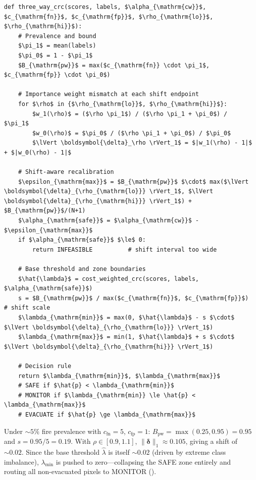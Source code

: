 \documentclass{article}
\begin{document}
\begin{center}
    \begin{minipage}{0.92\textwidth}
        \begin{lstlisting}[style=pseudocode, title={\textbf{Algorithm 1}\; Three-Way CRC for Wildfire Evacuation}]
def three_way_crc(scores, labels, $\alpha_{\mathrm{cw}}$, $c_{\mathrm{fn}}$, $c_{\mathrm{fp}}$, $\rho_{\mathrm{lo}}$, $\rho_{\mathrm{hi}}$):
    # Prevalence and bound
    $\pi_1$ = mean(labels)
    $\pi_0$ = 1 - $\pi_1$
    $B_{\mathrm{pw}}$ = max($c_{\mathrm{fn}} \cdot \pi_1$, $c_{\mathrm{fp}} \cdot \pi_0$)

    # Importance weight mismatch at each shift endpoint
    for $\rho$ in {$\rho_{\mathrm{lo}}$, $\rho_{\mathrm{hi}}$}:
        $w_1(\rho)$ = ($\rho \pi_1$) / ($\rho \pi_1 + \pi_0$) / $\pi_1$
        $w_0(\rho)$ = $\pi_0$ / ($\rho \pi_1 + \pi_0$) / $\pi_0$
        $\lVert \boldsymbol{\delta}_\rho \rVert_1$ = $|w_1(\rho) - 1|$ + $|w_0(\rho) - 1|$

    # Shift-aware recalibration
    $\epsilon_{\mathrm{max}}$ = $B_{\mathrm{pw}}$ $\cdot$ max($\lVert \boldsymbol{\delta}_{\rho_{\mathrm{lo}}} \rVert_1$, $\lVert \boldsymbol{\delta}_{\rho_{\mathrm{hi}}} \rVert_1$) + $B_{\mathrm{pw}}$/(N+1)
    $\alpha_{\mathrm{safe}}$ = $\alpha_{\mathrm{cw}}$ - $\epsilon_{\mathrm{max}}$
    if $\alpha_{\mathrm{safe}}$ $\le$ 0:
        return INFEASIBLE          # shift interval too wide

    # Base threshold and zone boundaries
    $\hat{\lambda}$ = cost_weighted_crc(scores, labels, $\alpha_{\mathrm{safe}}$)
    s = $B_{\mathrm{pw}}$ / max($c_{\mathrm{fn}}$, $c_{\mathrm{fp}}$)   # shift scale
    $\lambda_{\mathrm{min}}$ = max(0, $\hat{\lambda}$ - s $\cdot$ $\lVert \boldsymbol{\delta}_{\rho_{\mathrm{lo}}} \rVert_1$)
    $\lambda_{\mathrm{max}}$ = min(1, $\hat{\lambda}$ + s $\cdot$ $\lVert \boldsymbol{\delta}_{\rho_{\mathrm{hi}}} \rVert_1$)

    # Decision rule
    return $\lambda_{\mathrm{min}}$, $\lambda_{\mathrm{max}}$
    # SAFE if $\hat{p} < \lambda_{\mathrm{min}}$
    # MONITOR if $\lambda_{\mathrm{min}} \le \hat{p} < \lambda_{\mathrm{max}}$
    # EVACUATE if $\hat{p} \ge \lambda_{\mathrm{max}}$
\end{lstlisting}
    \end{minipage}
\end{center}
\label{alg:threeway}

Under ${\sim}5\%$ fire prevalence with $c_{\mathrm{fn}}{=}5$, $c_{\mathrm{fp}}{=}1$: $B_{\mathrm{pw}} = \max(0.25, 0.95) = 0.95$ and $s = 0.95/5 = 0.19$.
With $\rho \in [0.9, 1.1]$, $\lVert \boldsymbol{\delta} \rVert_1 \approx 0.105$, giving a shift of ${\sim}0.02$.
Since the base threshold $\hat{\lambda}$ is itself ${\sim}0.02$ (driven by extreme class imbalance), $\lambda_{\min}$ is pushed to zero---collapsing the SAFE zone entirely and routing all non-evacuated pixels to MONITOR ().
\end{document}
